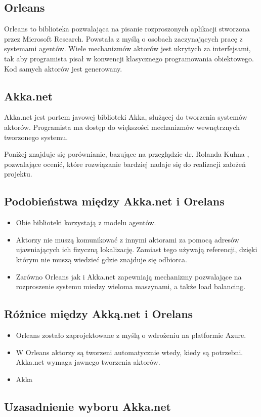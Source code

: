 \subsection{Orleans}
Orleans to biblioteka pozwalająca na pisanie rozproszonych aplikacji stworzona przez Microsoft Research.
Powstała z myślą o osobach zaczynających pracę z systemami agentów. 
Wiele mechanizmów aktorów jest ukrytych za interfejsami, tak aby programista pisał w konwencji klasycznego programowania obiektowego.  
Kod samych aktorów jest generowany.

\subsection{Akka.net}
Akka.net jest portem javowej biblioteki Akka, służącej do tworzenia systemów aktorów. 
Programista ma dostęp do większości mechanizmów wewnętrznych tworzonego systemu.

Poniżej znajduje się porównianie, bazujące na przeglądzie dr. Rolanda Kuhna \cite{bib:AkkaVsOrleans}, pozwalające ocenić, które rozwiązanie bardziej nadaje się do realizacji założeń projektu.

\subsection{Podobieństwa między Akka.net i Orelans}
\begin{itemize}
    \item Obie biblioteki korzystają z modelu agentów.
    \item Aktorzy nie muszą komunikować z innymi aktorami za pomocą adresów ujawniających ich fizyczną lokalizację. Zamiast tego używają referencji, dzięki którym nie muszą wiedzieć gdzie znajduje się odbiorca.
    \item Zarówno Orleans jak i Akka.net zapewniają mechanizmy pozwalające na rozproszenie systemu miedzy wieloma maszynami, a także load balancing.
    
\end{itemize}

\subsection{Różnice między Akką.net i Orelans}
\begin{itemize}
    \item Orleans zostało zaprojektowane z myślą o wdrożeniu na platformie Azure. 
    \item W Orleans aktorzy są tworzeni automatycznie wtedy, kiedy są potrzebni. Akka.net wymaga jawnego tworzenia aktorów. 
    \item Akka 
\end{itemize}

\subsection{Uzasadnienie wyboru Akka.net}


